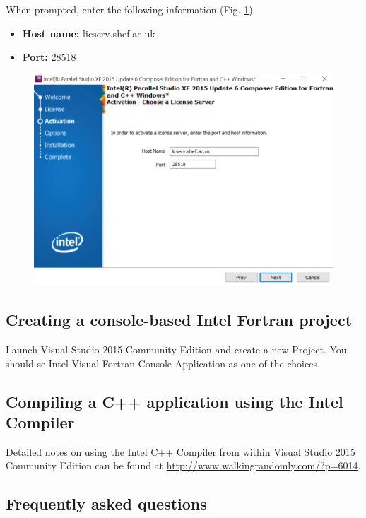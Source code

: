 \documentclass[10pt,a4paper,oneside]{article}
\begin{document}
When prompted, enter the following information (Fig. \ref{fig:VS5})
\begin{itemize}
\item \textbf{Host name:} licserv.shef.ac.uk
\item \textbf{Port:} 28518
\end{itemize}
\begin{figure}[ht]
\centering
\includegraphics[scale=0.4]{VS5.png}
\caption{}
\label{fig:VS5}
\end{figure}

\subsection*{Creating a console-based Intel Fortran project}
Launch Visual Studio 2015 Community Edition and create a new Project. You should se Intel Visual Fortran Console Application as one of the choices. 

\subsection*{Compiling a C++ application using the Intel Compiler}
Detailed notes on using the Intel C++ 
Compiler from within Visual Studio 2015 Community Edition can be found at \url{http://www.walkingrandomly.com/?p=6014}.

\subsection*{Frequently asked questions}
\end{document}
